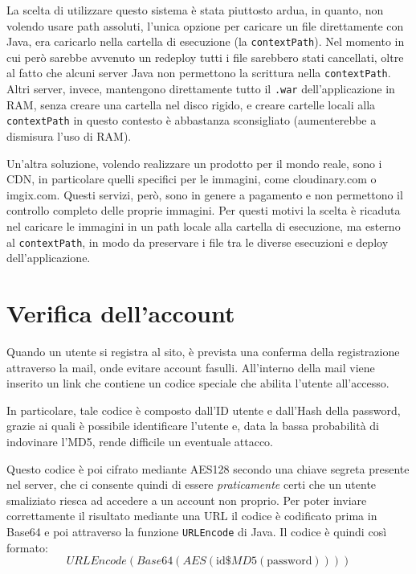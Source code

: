La scelta di utilizzare questo sistema è stata piuttosto ardua, in quanto, non volendo usare path assoluti, l'unica opzione per caricare un file direttamente con Java, era caricarlo nella cartella di esecuzione (la \texttt{contextPath}). Nel momento in cui però sarebbe avvenuto un redeploy tutti i file sarebbero stati cancellati, oltre al fatto che alcuni server Java non permettono la scrittura nella \texttt{contextPath}. Altri server, invece, mantengono direttamente tutto il \texttt{.war} dell'applicazione in RAM, senza creare una cartella nel disco rigido, e creare cartelle locali alla \texttt{contextPath} in questo contesto è abbastanza sconsigliato (aumenterebbe a dismisura l'uso di RAM).

Un'altra soluzione, volendo realizzare un prodotto per il mondo reale, sono i CDN, in particolare quelli specifici per le immagini, come cloudinary.com o imgix.com. Questi servizi, però, sono in genere a pagamento e non permettono il controllo completo delle proprie immagini. Per questi motivi la scelta è ricaduta nel caricare le immagini in un path locale alla cartella di esecuzione, ma esterno al \texttt{contextPath}, in modo da preservare i file tra le diverse esecuzioni e deploy dell'applicazione.




\chapter{Verifica dell'account}

Quando un utente si registra al sito, è prevista una conferma della registrazione attraverso la mail, onde evitare account fasulli. All'interno della mail viene inserito un link che contiene un codice speciale che abilita l'utente all'accesso.

In particolare, tale codice è composto dall'ID utente e dall'Hash della password, grazie ai quali è possibile identificare l'utente e, data la bassa probabilità di indovinare l'MD5, rende difficile un eventuale attacco.

Questo codice è poi cifrato mediante AES128 secondo una chiave segreta presente nel server, che ci consente quindi di essere \textit{praticamente} certi che un utente smaliziato riesca ad accedere a un account non proprio. Per poter inviare correttamente il risultato mediante una URL il codice è codificato prima in Base64 e poi attraverso la funzione \texttt{URLEncode} di Java. Il codice è quindi così formato:
\[
    URLEncode( Base64( AES( \mbox{id}\$MD5(\mbox{password}))))
\]

